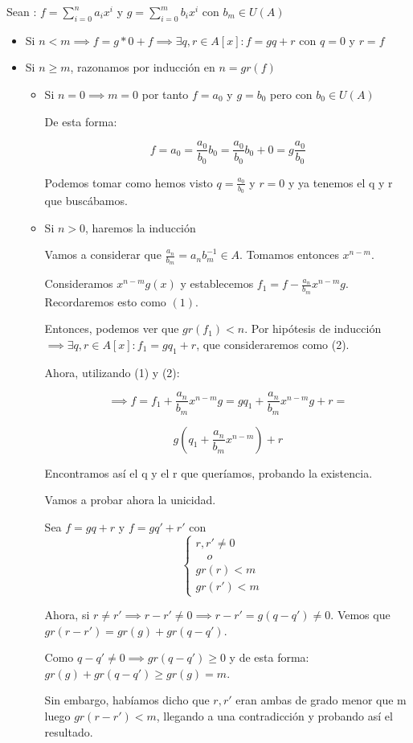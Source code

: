 \documentclass[11pt, a4paper, titlepage]{article}
\makeatletter
\renewenvironment{proof}[1][\proofname] {\vspace{-15pt}\par\pushQED{\qed}\normalfont\topsep6\p@\@plus6\p@\relax\trivlist\item[\hskip\labelsep\it#1\@addpunct{.}]\ignorespaces}{\popQED\endtrivlist\@endpefalse}
\theoremstyle{theorem-style}
\theoremstyle{definition-style}
\theoremstyle{remark-style}
\theoremstyle{example-style}
\makeatother
\begin{document}
\newpage
\begin{proof}
	
	Sean : $f = \sum_{i=0}^n a_i x^i$ y $g = \sum_{i=0}^m b_i x^i$ con $b_m \in U(A)$
	
	\begin{itemize}
	
	\item Si $n< m \implies f = g * 0 + f \implies \exists q,r\in A[x] : f = gq+r$ con $q=0$ y $r = f$
	
	\item Si $n\geq m$, razonamos por inducción en $n=gr(f)$
	\begin{itemize}
	
	\item Si $n=0 \implies m = 0$ por tanto $f=a_0$ y $g=b_0$ pero con $b_0 \in U(A)$
	
	De esta forma:
	
	\[
	f = a_0 = \frac{a_0}{b_0}b_0 = \frac{a_0}{b_0}b_0 + 0 = g\frac{a_0}{b_0}
	\]
	
	Podemos tomar como hemos visto $q=\frac{a_0}{b_0}$ y $r=0$ y ya tenemos el q y r que buscábamos.
	
	\item Si $n> 0$, haremos la inducción
	
	Vamos a considerar que $\frac{a_n}{b_m} = a_n b_m^{-1} \in A$. Tomamos entonces $x^{n-m}$.
	
	Consideramos $x^{n-m}g(x)$ y establecemos $f_1 = f - \frac{a_n}{b_m}x^{n-m}g$. Recordaremos esto como $(1)$.
	
	Entonces, podemos ver que $gr(f_1) < n$. Por hipótesis de inducción $\implies \exists q,r \in A[x] : f_1 = gq_1 + r$, que consideraremos como (2).
	
	Ahora, utilizando (1) y (2):
	
	 \[
	 \implies f = f_1 +\frac{a_n}{b_m}x^{n-m}g = gq_1 + \frac{a_n}{b_m}x^{n-m}g +r = 
	 \]
	 
	 \[
	 g(q_1 + \frac{a_n}{b_m}x^{n-m}) + r
	 \]
	
	Encontramos así el q y el r que queríamos, probando la existencia.
	
	Vamos a probar ahora la unicidad.
	
	Sea $f=gq+r$ y $f= gq' +r'$ con
	\[
    \begin{cases}
		 r,r' \neq 0\\
		  \quad o \\
 gr(r) < m 
 \\ gr(r') < m
		   
\end{cases}
	\quad
	\]
	
	Ahora, si $r\neq r'\implies r-r' \neq 0 \implies r-r' = g(q-q') \neq 0$.
	Vemos que $gr(r-r') = gr(g)+ gr(q-q')$.
	
 Como $q-q' \neq 0 \implies gr(q-q') \geq 0 $ y de esta forma: $gr(g)+ gr(q-q') \geq gr(g) = m$.
 
 Sin embargo, habíamos dicho que $r,r'$ eran ambas de grado menor que m luego $gr(r-r') < m$, llegando a una contradicción y probando así el resultado.
\end{itemize} 
	
	
\end{itemize}
\end{proof}
\end{document}
